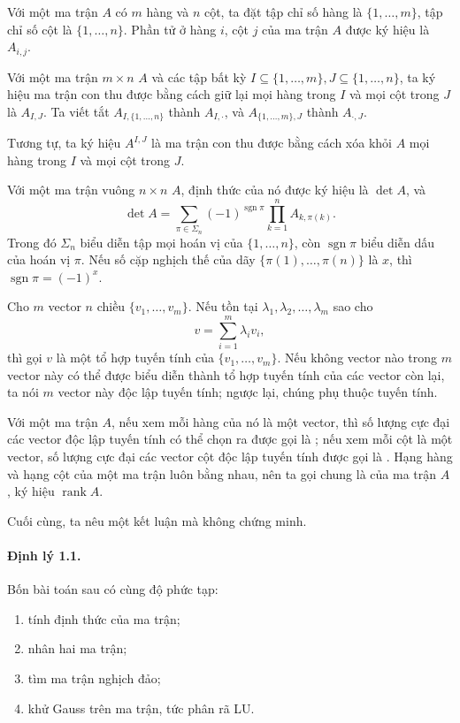 \documentclass[11pt]{article}
\newcommand{\rank}{\operatorname{rank}}
\newcommand{\sgn}{\operatorname{sgn}}
\begin{document}
Với một ma trận \(A\) có \(m\) hàng và \(n\) cột, ta đặt tập chỉ số hàng là
\(\{1,\ldots,m\}\), tập chỉ số cột là \(\{1,\ldots,n\}\). Phần tử ở hàng \(i\),
cột \(j\) của ma trận \(A\) được ký hiệu là \(A_{i,j}\).

Với một ma trận \(m\times n\) \(A\) và các tập bất kỳ
\(I\subseteq\{1,\ldots,m\}, J\subseteq\{1,\ldots,n\}\), ta ký hiệu ma trận con
thu được bằng cách giữ lại mọi hàng trong \(I\) và mọi cột trong \(J\) là
\(A_{I,J}\). Ta viết tắt \(A_{I,\{1,\ldots,n\}}\) thành \(A_{I,\cdot}\), và
\(A_{\{1,\ldots,m\},J}\) thành \(A_{\cdot,J}\).

Tương tự, ta ký hiệu \(A^{I,J}\) là ma trận con thu được bằng cách xóa khỏi
\(A\) mọi hàng trong \(I\) và mọi cột trong \(J\).

Với một ma trận vuông \(n\times n\) \(A\), định thức của nó được ký hiệu là
\(\det A\), và
\[
  \det A=
  \sum_{\pi\in\Sigma_n}(-1)^{\sgn\pi}
  \prod_{k=1}^{n} A_{k,\pi(k)}.
\]
Trong đó \(\Sigma_n\) biểu diễn tập mọi hoán vị của \(\{1,\ldots,n\}\), còn
\(\sgn\pi\) biểu diễn dấu của hoán vị \(\pi\). Nếu số cặp nghịch thế của dãy
\(\{\pi(1),\ldots,\pi(n)\}\) là \(x\), thì \(\sgn\pi=(-1)^x\).

Cho \(m\) vector \(n\) chiều \(\{v_1,\ldots,v_m\}\). Nếu tồn tại
\(\lambda_1,\lambda_2,\ldots,\lambda_m\) sao cho
\[
  v=\sum_{i=1}^{m}\lambda_i v_i,
\]
thì gọi \(v\) là một tổ hợp tuyến tính của \(\{v_1,\ldots,v_m\}\). Nếu không
vector nào trong \(m\) vector này có thể được biểu diễn thành tổ hợp tuyến
tính của các vector còn lại, ta nói \(m\) vector này độc lập tuyến tính; ngược
lại, chúng phụ thuộc tuyến tính.

Với một ma trận \(A\), nếu xem mỗi hàng của nó là một vector, thì số lượng cực
đại các vector độc lập tuyến tính có thể chọn ra được gọi là ;
nếu xem mỗi cột là một vector, số lượng cực đại các vector cột độc lập tuyến
tính được gọi là . Hạng hàng và hạng cột của một ma trận luôn
bằng nhau, nên ta gọi chung là  của ma trận \(A\), ký hiệu
\(\rank A\).

Cuối cùng, ta nêu một kết luận mà không chứng minh.

\paragraph{Định lý 1.1.}
Bốn bài toán sau có cùng độ phức tạp:
\begin{enumerate}
  \item tính định thức của ma trận;
  \item nhân hai ma trận;
  \item tìm ma trận nghịch đảo;
  \item khử Gauss trên ma trận, tức phân rã LU.
\end{enumerate}
\end{document}
